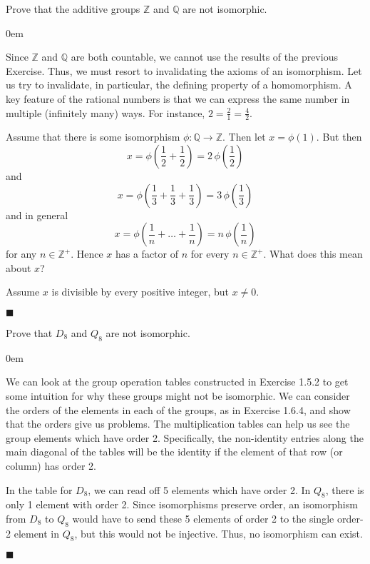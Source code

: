\documentclass[12pt]{article}
\renewcommand{\qed}{\hfill$\blacksquare$}
\renewenvironment{proof}{\begin{addmargin}[1em]{0em}\begin{newproof}}{\end{newproof}\end{addmargin}\qed}
\newenvironment{problem}[2][Exercise]{\begin{trivlist}
\item[\hskip \labelsep {\bfseries #1}\hskip \labelsep {\bfseries #2.}]}{\end{trivlist}}
\begin{document}
\begin{problem}{1.6.6}
Prove that the additive groups $\mathbb{Z}$ and $\mathbb{Q}$ are not isomorphic.
\end{problem}
\begin{proof}
Since $\mathbb{Z}$ and $\mathbb{Q}$ are both countable, we cannot use the results of the previous Exercise. Thus, we must resort to invalidating the axioms of an isomorphism. Let us try to invalidate, in particular, the defining property of a homomorphism. A key feature of the rational numbers is that we can express the same number in multiple (infinitely many) ways. For instance, $2= \frac{2}{1}=\frac{4}{2}$.

Assume that there is some isomorphism $\phi:\mathbb{Q}\rightarrow \mathbb{Z}$. Then let $x= \phi\left(1\right)$. But then $$ x= \phi\left(\frac{1}{2}+\frac{1}{2}\right) = 2\,\phi\left(\frac{1}{2}\right) $$ and
$$ x = \phi\left(\frac{1}{3}+\frac{1}{3}+\frac{1}{3}\right) = 3\, \phi\left(\frac{1}{3}\right) $$ and in general
$$ x = \phi\left(\frac{1}{n}+\ldots+\frac{1}{n}\right) = n\, \phi\left(\frac{1}{n}\right) $$
for any $n\in \mathbb{Z}^+$. Hence $x$ has a factor of $n$ for every $n\in \mathbb{Z}^+$. What does this mean about $x$?

Assume $x$ is divisible by every positive integer, but $x\neq 0$.

\end{proof}









\begin{problem}{1.6.7}
Prove that $D_8$ and $Q_8$ are not isomorphic.
\end{problem}
\begin{proof}
We can look at the group operation tables constructed in Exercise 1.5.2 to get some intuition for why these groups might not be isomorphic. We can consider the orders of the elements in each of the groups, as in Exercise 1.6.4, and show that the orders give us problems. The multiplication tables can help us see the group elements which have order 2. Specifically, the non-identity entries along the main diagonal of the tables will be the identity if the element of that row (or column) has order 2.

In the table for $D_8$, we can read off 5 elements which have order 2. In $Q_8$, there is only 1 element with order 2. Since isomorphisms preserve order, an isomorphism from $D_8$ to $Q_8$ would have to send these 5 elements of order 2 to the single order-2 element in $Q_8$, but this would not be injective. Thus, no isomorphism can exist.
\end{proof}
\end{document}

